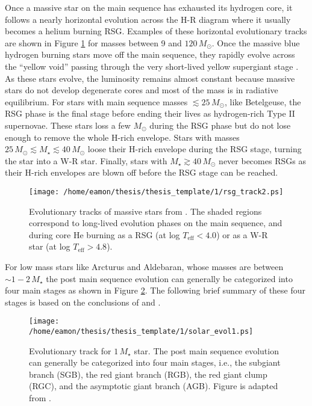 Once a massive star on the main sequence has exhausted its  hydrogen core, it follows a nearly horizontal evolution across the H-R diagram where it usually becomes a helium burning RSG. Examples of these horizontal evolutionary tracks are shown in Figure \ref{fig:1.5.2.1} for masses between 9 and $120\,M_{\odot}$. Once the massive blue hydrogen burning stars move off the main sequence, they rapidly evolve across the ``yellow void'' passing through the very short-lived yellow supergiant stage \citep{levesque_2010}. As these stars evolve, the luminosity remains almost constant because massive stars do not develop degenerate cores and most of the mass is in radiative equilibrium. For stars with main sequence masses $\lesssim 25\,M_{\odot}$, like Betelgeuse, the RSG phase is the final stage before ending their lives as hydrogen-rich Type II supernovae. These stars loss a few $M_{\odot}$ during the RSG phase but do not lose enough to remove the whole H-rich envelope. Stars with masses $25\,M_{\odot}\lesssim M_{\star} \lesssim 40\,M_{\odot}$ loose their H-rich envelope during the RSG stage, turning the star into a W-R star. Finally, stars with $M_{\star} \gtrsim 40\,M_{\odot}$ never becomes RSGs as their H-rich envelopes are blown off before the RSG stage can be reached.

\begin{figure}[hbt!]
\centering 
          \texttt{[image: /home/eamon/thesis/thesis\_template/1/rsg\_track2.ps]}
\caption[Evolutionary tracks of massive stars]{Evolutionary tracks of massive stars from \cite{maeder_1987}. The shaded regions correspond to long-lived evolution phases on the main sequence, and during core He burning as a RSG (at log $T_{\mathrm{eff}} < 4.0$) or as a W-R star (at log $T_{\mathrm{eff}} > 4.8$).}
\label{fig:1.5.2.1}
\end{figure}

For low mass stars like Arcturus and Aldebaran, whose masses are between $\sim 1-2\,M_{\star}$ the post main sequence evolution can generally be categorized into four main stages as shown in Figure \ref{fig:1.5.2.2}. The following brief summary of these four stages is based on the conclusions of \cite{iben_1967} and \cite{ryan_2010}.

\begin{figure}[hbt!]
\centering 
    \texttt{[image: /home/eamon/thesis/thesis\_template/1/solar\_evol1.ps]}
\caption[Evolution track of a low mass star]{Evolutionary track for $1\,M_{\star}$ star. The post main sequence evolution can generally be categorized into four main stages, i.e., the subgiant branch (SGB), the red giant branch (RGB), the red giant clump (RGC), and the asymptotic giant branch (AGB). Figure is adapted from \cite{ryan_2010}.}
\label{fig:1.5.2.2}
\end{figure}

